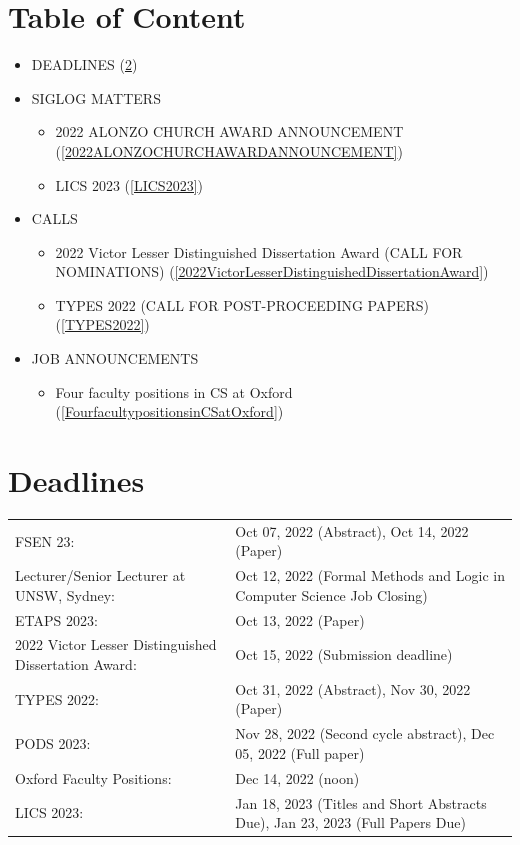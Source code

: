 \documentclass[prodmode,acmtecs]{acmsmall} %
\begin{document}
\section{Table of Content}\begin{itemize}\item DEADLINES (\cref{deadlines}) 
 
\item SIGLOG MATTERS 
 
\begin{itemize}\item 2022 ALONZO CHURCH AWARD ANNOUNCEMENT (\cref{2022ALONZOCHURCHAWARDANNOUNCEMENT})
\item LICS 2023 (\cref{LICS2023})
\end{itemize} 
\item CALLS 
 
\begin{itemize}\item 2022 Victor Lesser Distinguished Dissertation Award (CALL FOR NOMINATIONS) (\cref{2022VictorLesserDistinguishedDissertationAward})
\item TYPES 2022 (CALL FOR POST-PROCEEDING PAPERS) (\cref{TYPES2022})
\end{itemize} 
\item JOB ANNOUNCEMENTS 
 
\begin{itemize}\item Four faculty positions in CS at Oxford (\cref{FourfacultypositionsinCSatOxford})
\end{itemize} 
\end{itemize}\section{Deadlines}\label{deadlines}\begin{tabulary}{\linewidth}{LL}FSEN 23:  & Oct 07, 2022 (Abstract), Oct 14, 2022 (Paper) \\
Lecturer/Senior Lecturer at UNSW, Sydney:  & Oct 12, 2022 (Formal Methods and Logic in Computer Science Job Closing) \\
ETAPS 2023:  & Oct 13, 2022 (Paper) \\
2022 Victor Lesser Distinguished Dissertation Award:  & Oct 15, 2022 (Submission deadline) \\
TYPES 2022:  & Oct 31, 2022 (Abstract), Nov 30, 2022 (Paper) \\
PODS 2023:  & Nov 28, 2022 (Second cycle abstract), Dec 05, 2022 (Full paper) \\
Oxford Faculty Positions:  & Dec 14, 2022 (noon) \\
LICS 2023:  & Jan 18, 2023 (Titles and Short Abstracts Due), Jan 23, 2023 (Full Papers Due) \\
\end{tabulary}
\end{document}
